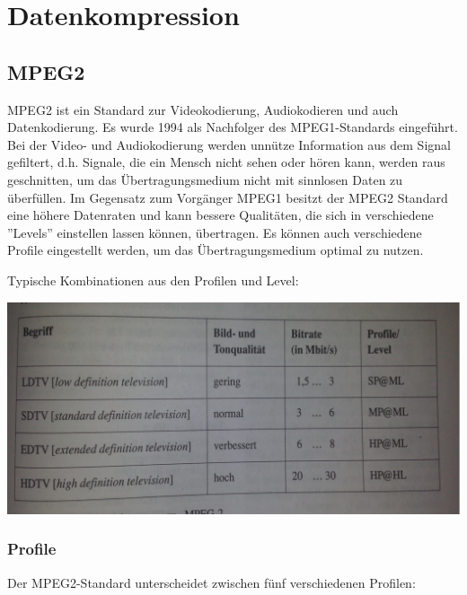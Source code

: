 \documentclass[a4paper]{article}
\begin{document}
\newpage

\section{Datenkompression}

\subsection{MPEG2}

MPEG2 ist ein Standard zur Videokodierung, Audiokodieren und auch Datenkodierung. Es wurde 1994 als Nachfolger des MPEG1-Standards eingeführt.
\newline
Bei der Video- und Audiokodierung werden unnütze Information aus dem Signal gefiltert, d.h. Signale, die ein Mensch nicht sehen oder hören kann, werden raus geschnitten, um das Übertragungsmedium nicht mit sinnlosen Daten zu überfüllen. Im Gegensatz zum Vorgänger MPEG1 besitzt der MPEG2 Standard eine höhere Datenraten und kann bessere Qualitäten, die sich in verschiedene ''Levels'' einstellen lassen können, übertragen. Es können auch verschiedene Profile eingestellt werden, um das Übertragungsmedium optimal zu nutzen.
\newline
\newline

Typische Kombinationen aus den Profilen und Level:

\includegraphics[scale=0.16]{3.png}

\subsubsection{Profile}

Der MPEG2-Standard unterscheidet zwischen fünf verschiedenen Profilen:
\end{document}
